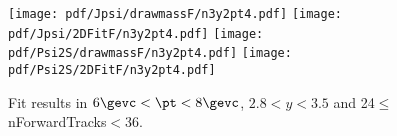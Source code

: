 \begin{figure}[H]
\begin{center}
\texttt{[image: pdf/Jpsi/drawmassF/n3y2pt4.pdf]}
\texttt{[image: pdf/Jpsi/2DFitF/n3y2pt4.pdf]}
\vspace*{-0.5cm}
\texttt{[image: pdf/Psi2S/drawmassF/n3y2pt4.pdf]}
\texttt{[image: pdf/Psi2S/2DFitF/n3y2pt4.pdf]}
\vspace*{-0.5cm}
\end{center}
\caption{Fit results in $6\gevc<\pt<8\gevc$, $2.8<y<3.5$ and 24$\leq$nForwardTracks$<$36.}
\label{Fitn3y2pt4}
\end{figure}
